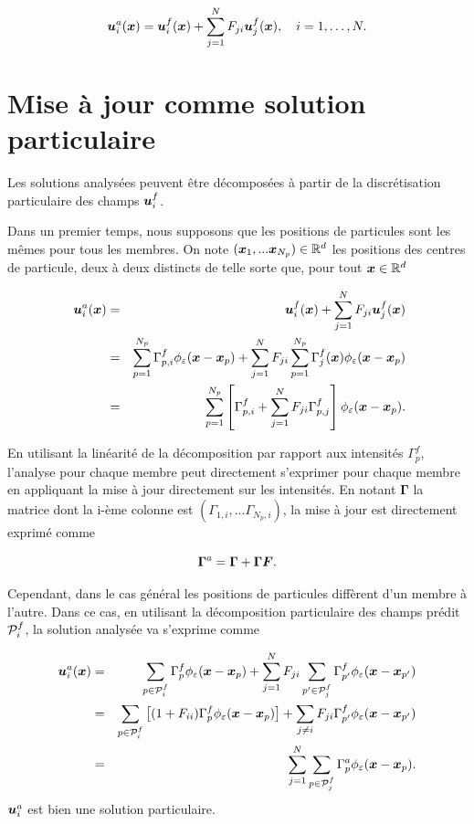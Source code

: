 \begin{equation}
    \bm{u}_i^a(\bm{x}) =\bm{u}_i^f(\bm{x}) + \sum_{j=1}^{N} F_{ji} \bm{u}_j ^f(\bm{x}), \quad i = 1, \dots, N.
\end{equation}

\section{Mise à jour comme solution particulaire}

Les solutions analysées peuvent être décomposées à partir de la discrétisation particulaire des champs $\bm{u}_i^f$.

Dans un premier temps, nous supposons que les positions de particules sont les mêmes pour tous les membres. On note $(\bm{x}_1,...\bm{x}_{N_p}) \in \mathbb{R}^d$ les positions des centres de particule, deux à deux distincts de telle sorte que, pour tout $\bm{x} \in \mathbb{R}^d$

\begin{eqnarray*}~\label{eq:enkf_formula_same_part}
    \bm{u}_i^a(\bm{x}) &=& \bm{u}_i^f(\bm{x}) + \sum_{j=1}^{N} F_{ji} \bm{u}_j ^f(\bm{x}) \\
    &=& \sum_{p=1}^{N_p} \Gamma^f_{p,i} \phi_{\varepsilon}(\bm{x} - \bm{x}_p) + \sum_{j=1}^{N} F_{ji} \sum_{p=1}^{N_p} \Gamma_j ^f(\bm{x}) \phi_{\varepsilon}(\bm{x} - \bm{x}_p) \\
    &=& \sum_{p=1}^{N_p} \left[\Gamma^f_{p,i} + \sum_{j=1}^{N} F_{ji} \Gamma^f_{p,j} \right] \phi_{\varepsilon}(\bm{x} - \bm{x}_p).
\end{eqnarray*}

En utilisant la linéarité de la décomposition par rapport aux intensités $\Gamma^f_{p}$, l'analyse pour chaque membre peut directement s'exprimer pour chaque membre en appliquant la mise à jour directement sur les intensités. En notant $\bm \Gamma$ la matrice dont la i-ème colonne est $(\Gamma_{1, i},...\Gamma_{N_p, i})$, la mise à jour est directement exprimé comme

\begin{equation*}
    \bm \Gamma^a = \bm \Gamma + \bm \Gamma \bm{F}.
\end{equation*}

Cependant, dans le cas général les positions de particules diffèrent d'un membre à l'autre. Dans ce cas, en utilisant la décomposition particulaire des champs prédit $\mathcal{P}_i^f$, la solution analysée va s'exprime comme

\begin{eqnarray*}
    \bm{u}_i^a(\bm{x}) &=& \sum_{p \in \mathcal{P}_i^f}\Gamma^f_p \phi_{\varepsilon}(\bm{x} - \bm{x}_p) + \sum_{j=1}^{N} F_{ji}  \sum_{p' \in \mathcal{P}_j^f}\Gamma^f_{p'} \phi_{\varepsilon}(\bm{x} - \bm{x}_{p'}) \\
    &=& \sum_{p \in \mathcal{P}_i^f}\left[(1 + F_{ii})\Gamma^f_p \phi_{\varepsilon}(\bm{x} - \bm{x}_{p})\right]   + \sum_{j\neq i} F_{ji} \Gamma^f_{p'} \phi_{\varepsilon}(\bm{x} - \bm{x}_{p'}) \\
    &=& \sum_{j=1}^{N} \sum_{p \in \mathcal{P}_j^f} \Gamma^a_p \phi_{\varepsilon}(\bm{x} - \bm{x}_p).
\end{eqnarray*}
$\bm{u}_i^a$ est bien une solution particulaire.


